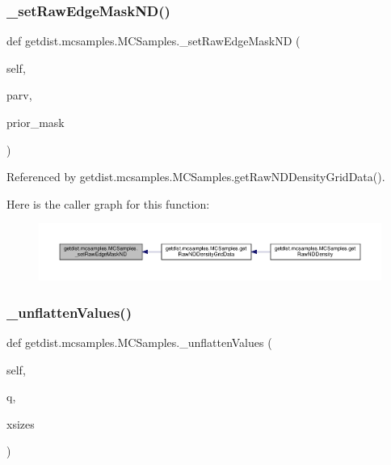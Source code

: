 \subsubsection{\texorpdfstring{\+\_\+set\+Raw\+Edge\+Mask\+N\+D()}{\_setRawEdgeMaskND()}}
{\footnotesize\ttfamily def getdist.\+mcsamples.\+M\+C\+Samples.\+\_\+set\+Raw\+Edge\+Mask\+ND (\begin{DoxyParamCaption}\item[{}]{self,  }\item[{}]{parv,  }\item[{}]{prior\+\_\+mask }\end{DoxyParamCaption})\hspace{0.3cm}{\ttfamily [private]}}



Referenced by getdist.\+mcsamples.\+M\+C\+Samples.\+get\+Raw\+N\+D\+Density\+Grid\+Data().

Here is the caller graph for this function\+:
\nopagebreak
\begin{figure}[H]
\begin{center}
\leavevmode
\includegraphics[width=350pt]{classgetdist_1_1mcsamples_1_1MCSamples_a07f58b45eeec904f47f0f7f47324c5d0_icgraph}
\end{center}
\end{figure}
\mbox{\label{classgetdist_1_1mcsamples_1_1MCSamples_a3847cc1c604f47b2fefca5c9d9d2b28b}} 
\subsubsection{\texorpdfstring{\+\_\+unflatten\+Values()}{\_unflattenValues()}}
{\footnotesize\ttfamily def getdist.\+mcsamples.\+M\+C\+Samples.\+\_\+unflatten\+Values (\begin{DoxyParamCaption}\item[{}]{self,  }\item[{}]{q,  }\item[{}]{xsizes }\end{DoxyParamCaption})\hspace{0.3cm}{\ttfamily [private]}}



